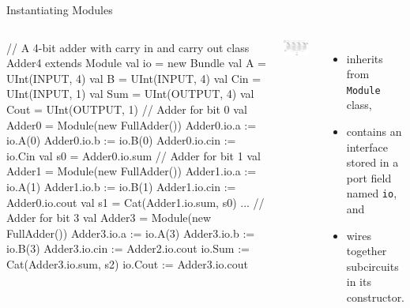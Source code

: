 \documentclass[xcolor=pdflatex,dvipsnames,table]{beamer}
\begin{document}
\begin{frame}[fragile]{Instantiating Modules}

\begin{columns}


{
\begin{scala}
// A 4-bit adder with carry in and carry out
class Adder4 extends Module {
  val io = new Bundle {
    val A    = UInt(INPUT, 4)
    val B    = UInt(INPUT, 4)
    val Cin  = UInt(INPUT, 1)
    val Sum  = UInt(OUTPUT, 4)
    val Cout = UInt(OUTPUT, 1)
  }
  // Adder for bit 0
  val Adder0 = Module(new FullAdder())
  Adder0.io.a   := io.A(0)
  Adder0.io.b   := io.B(0)
  Adder0.io.cin := io.Cin
  val s0 = Adder0.io.sum
  // Adder for bit 1
  val Adder1 = Module(new FullAdder())
  Adder1.io.a   := io.A(1)
  Adder1.io.b   := io.B(1)
  Adder1.io.cin := Adder0.io.cout
  val s1 = Cat(Adder1.io.sum, s0)
  ...
  // Adder for bit 3
  val Adder3 = Module(new FullAdder())
  Adder3.io.a   := io.A(3)
  Adder3.io.b   := io.B(3)
  Adder3.io.cin := Adder2.io.cout
  io.Sum  := Cat(Adder3.io.sum, s2)
  io.Cout := Adder3.io.cout
}
\end{scala}
}


\begin{center}
\includegraphics[width=0.9\textwidth]{../tootorial/4_Bit_Adder.jpg}
\end{center}

\begin{itemize}
\item inherits from \verb+Module+ class,
\item contains an interface stored in a port field named \verb+io+, and
\item wires together subcircuits in its constructor.
\end{itemize}

\end{columns}

\end{frame}
\end{document}
